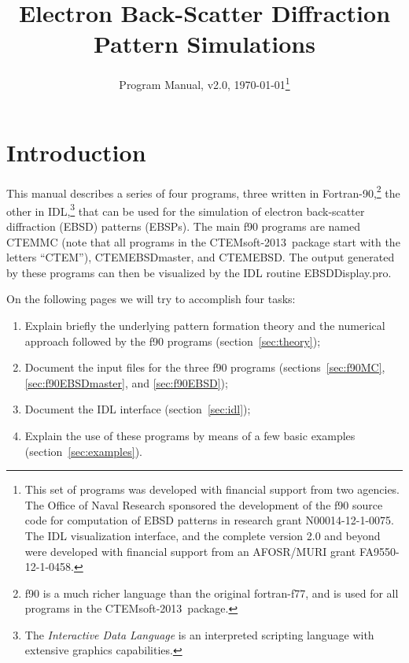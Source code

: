 \documentclass[DIV=calc, paper=letter, fontsize=11pt]{scrartcl}	 %
\title{Electron Back-Scatter Diffraction Pattern Simulations} %
\author{\vspace*{-0.7in}} %
\date{Program Manual, v2.0, \today\protect\footnote{This set of programs was developed with financial support from two agencies. 
The Office of Naval Research sponsored the development of the f90 source code for computation of EBSD patterns in research 
grant N00014-12-1-0075.  The IDL visualization interface, and the complete version 2.0 and beyond were developed with financial 
support from an AFOSR/MURI grant FA9550-12-1-0458.}}
\newcommand{\ctp}{\textsf{CTEMsoft-2013}}
\begin{document}
\maketitle

\begin{figure}[h]
\leavevmode\centering
{}
\end{figure}

\renewcommand{\contentsname}{Table of Contents}
{\small\tableofcontents}

\newpage
\section{Introduction}
This manual describes a series of four programs, 
three written in Fortran-90,\footnote{f90 is a much richer language than the original fortran-f77, and is
used for all programs in the \ctp\ package.} 
the other in IDL,\footnote{The \textit{Interactive Data Language} is an interpreted scripting language with extensive graphics capabilities.} 
that can be used for the simulation of electron back-scatter diffraction (EBSD) patterns (EBSPs).  The main f90 programs
are named \textsf{CTEMMC} (note that all programs in the \ctp\ package start with the letters ``CTEM''), \textsf{CTEMEBSDmaster},
and \textsf{CTEMEBSD}.
The output generated by these programs can then be visualized by the IDL routine \textsf{EBSDDisplay.pro}.  

On the following pages we will try to accomplish four tasks:
\begin{enumerate}
	\item Explain briefly the underlying pattern formation theory and the numerical approach followed by the f90 programs (section~\ref{sec:theory});
	\item Document the input files for the three f90 programs (sections~\ref{sec:f90MC}, \ref{sec:f90EBSDmaster}, and \ref{sec:f90EBSD});
	\item Document the IDL interface (section~\ref{sec:idl});
	\item Explain the use of these programs by means of a few basic examples (section~\ref{sec:examples}).
\end{enumerate}




\newpage
\end{document}
